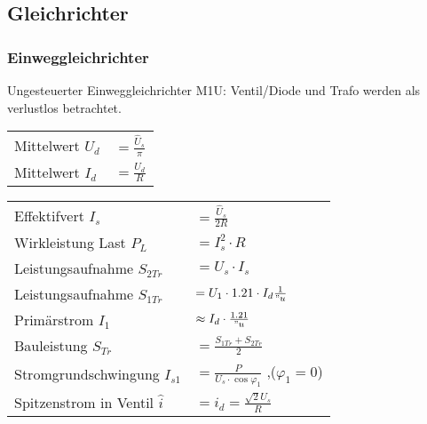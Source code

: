 \subsection{Gleichrichter}
\begin{multicols}{2}
\subsubsection{Einweggleichrichter}
Ungesteuerter Einweggleichrichter M1U: \newline
Ventil/Diode und Trafo werden als verlustlos betrachtet.

\renewcommand{\arraystretch}{1.5}
\begin{tabular}{ll}
	Mittelwert $U_d$ 				& $ = \frac{\hat{U}_s}{\pi}$ \\
	Mittelwert $I_d$ 				& $ = \frac{U_d}{R}$ \\
\end{tabular}

\begin{tabular}{ll}
	Effektifvert $I_s$				& $ = \frac{\hat{U}_s}{2R}$ \\
	Wirkleistung Last $P_L$			& $ = I_s^2 \cdot R$ \\
	Leistungsaufnahme $S_{2Tr}$		& $ = U_s \cdot I_s$ \\
	Leistungsaufnahme $S_{1Tr}$		& $ = U_1 \cdot 1.21 \cdot I_d \frac{1}{"u}$ \\
	Primärstrom $I_1$				& $ \approx I_d \cdot \frac{1.21}{"u} $ \\
	Bauleistung $S_{Tr}$			& $ = \frac{S_{1Tr} + S_{2Tr}}{2}$ \\
	Stromgrundschwingung $I_{s1}$	& $ = \frac{P}{U_s \cdot \cos\varphi_1}$ ,($\varphi_1 = 0$) \\
	Spitzenstrom in Ventil $\hat{i}$& $ = \hat{i}_d = \frac{\sqrt{2} U_s}{R}$ \\
\end{tabular}
\end{multicols}

